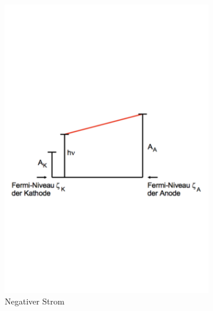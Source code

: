 \begin{figure}
 \centering
 \begin{subfigure}{0.48\textwidth}
  \centering
  \includegraphics[width=1.2\textwidth]{500-6.pdf}
  \caption{Negativer Strom \cite{1}}
  \label{fig:500-6}
 \end{subfigure}
 \begin{subfigure}{0.48\textwidth}
  \centering

\end{subfigure}
\end{figure}
